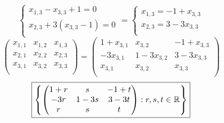 \documentclass[../practica.root.tex]{subfiles}
\begin{document}
\begin{enumerate}
\[\begin{cases}
                  x_{1,3} - x_{3,3} + 1 = 0    \\
                  x_{2,3} + 3(x_{3,3} - 1) = 0 \\
              \end{cases}
              =
              \begin{cases}
                  x_{1,3} = -1 + x_{3,3} \\
                  x_{2,3} = 3 - 3x_{3,3} \\
              \end{cases}
          \]
          \[
              \begin{pmatrix}
                  x_{1,1} & x_{1,2} & x_{1,3} \\
                  x_{2,1} & x_{2,2} & x_{2,3} \\
                  x_{3,1} & x_{3,2} & x_{3,3} \\
              \end{pmatrix}
              =
              \begin{pmatrix}
                  1 + x_{3,1} & x_{3,2}      & -1 + x_{3,3} \\
                  -3x_{3,1}   & 1 - 3x_{3,2} & 3 - 3x_{3,3} \\
                  x_{3,1}     & x_{3,2}      & x_{3,3}      \\
              \end{pmatrix}
          \] \[
              \boxed{
                  \left\{
                  \begin{pmatrix}
                      1 + r & s      & -1 + t \\
                      -3r   & 1 - 3s & 3 - 3t \\
                      r     & s      & t      \\
                  \end{pmatrix}
                  :r, s, t \in \mathbb{R}
                  \right\}
              }
          \]


\end{enumerate}
\end{document}
